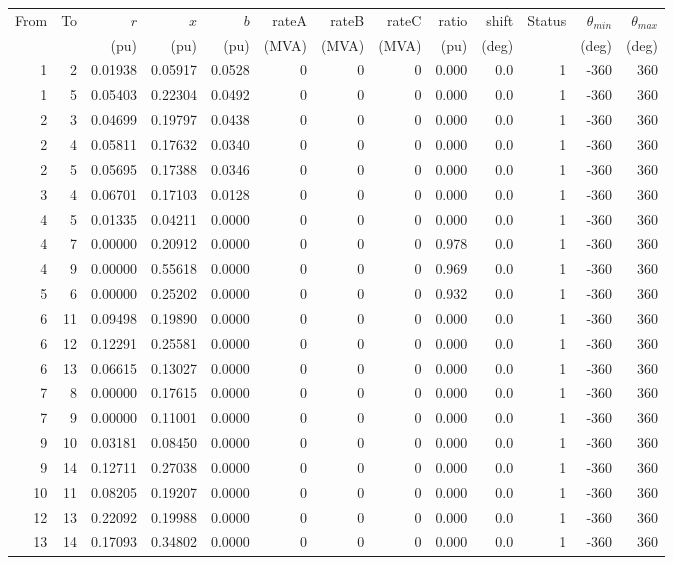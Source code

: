 \begin{tabular}{r r r r r r r r r r r r r}\toprule
From & To & {$r$} & {$x$} & {$b$} & {rateA} & {rateB} & {rateC} & {ratio} & {shift} & Status & {$\theta_{min}$} & {$\theta_{max}$} \\ 
{} & {} & {(pu)} & {(pu)} & {(pu)} & {(MVA)} & {(MVA)} & {(MVA)} & {(pu)} & {(deg)} & {} & {(deg)} & {(deg)} \\ \midrule
1 & 2 & 0.01938 & 0.05917 & 0.0528 & 0 & 0 & 0 & 0.000 & 0.0 & 1 & -360 & 360 \\ 
1 & 5 & 0.05403 & 0.22304 & 0.0492 & 0 & 0 & 0 & 0.000 & 0.0 & 1 & -360 & 360 \\ 
2 & 3 & 0.04699 & 0.19797 & 0.0438 & 0 & 0 & 0 & 0.000 & 0.0 & 1 & -360 & 360 \\ 
2 & 4 & 0.05811 & 0.17632 & 0.0340 & 0 & 0 & 0 & 0.000 & 0.0 & 1 & -360 & 360 \\ 
2 & 5 & 0.05695 & 0.17388 & 0.0346 & 0 & 0 & 0 & 0.000 & 0.0 & 1 & -360 & 360 \\ 
3 & 4 & 0.06701 & 0.17103 & 0.0128 & 0 & 0 & 0 & 0.000 & 0.0 & 1 & -360 & 360 \\ 
4 & 5 & 0.01335 & 0.04211 & 0.0000 & 0 & 0 & 0 & 0.000 & 0.0 & 1 & -360 & 360 \\ 
4 & 7 & 0.00000 & 0.20912 & 0.0000 & 0 & 0 & 0 & 0.978 & 0.0 & 1 & -360 & 360 \\ 
4 & 9 & 0.00000 & 0.55618 & 0.0000 & 0 & 0 & 0 & 0.969 & 0.0 & 1 & -360 & 360 \\ 
5 & 6 & 0.00000 & 0.25202 & 0.0000 & 0 & 0 & 0 & 0.932 & 0.0 & 1 & -360 & 360 \\ 
6 & 11 & 0.09498 & 0.19890 & 0.0000 & 0 & 0 & 0 & 0.000 & 0.0 & 1 & -360 & 360 \\ 
6 & 12 & 0.12291 & 0.25581 & 0.0000 & 0 & 0 & 0 & 0.000 & 0.0 & 1 & -360 & 360 \\ 
6 & 13 & 0.06615 & 0.13027 & 0.0000 & 0 & 0 & 0 & 0.000 & 0.0 & 1 & -360 & 360 \\ 
7 & 8 & 0.00000 & 0.17615 & 0.0000 & 0 & 0 & 0 & 0.000 & 0.0 & 1 & -360 & 360 \\ 
7 & 9 & 0.00000 & 0.11001 & 0.0000 & 0 & 0 & 0 & 0.000 & 0.0 & 1 & -360 & 360 \\ 
9 & 10 & 0.03181 & 0.08450 & 0.0000 & 0 & 0 & 0 & 0.000 & 0.0 & 1 & -360 & 360 \\ 
9 & 14 & 0.12711 & 0.27038 & 0.0000 & 0 & 0 & 0 & 0.000 & 0.0 & 1 & -360 & 360 \\ 
10 & 11 & 0.08205 & 0.19207 & 0.0000 & 0 & 0 & 0 & 0.000 & 0.0 & 1 & -360 & 360 \\ 
12 & 13 & 0.22092 & 0.19988 & 0.0000 & 0 & 0 & 0 & 0.000 & 0.0 & 1 & -360 & 360 \\ 
13 & 14 & 0.17093 & 0.34802 & 0.0000 & 0 & 0 & 0 & 0.000 & 0.0 & 1 & -360 & 360 \\ 
\bottomrule\end{tabular}
